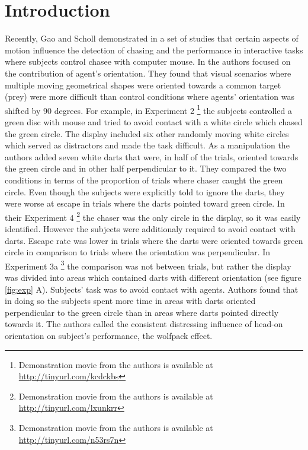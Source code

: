\documentclass[10pt]{article}
\begin{document}
\section*{Introduction}
Recently, Gao and Scholl demonstrated in a set of studies \cite{gao09,gao10,gao11} that certain aspects of motion influence the detection of chasing and the performance in interactive tasks where subjects control chasee with computer mouse. 
In \cite{gao10} the authors focused on the contribution of agent's orientation. 
They found that visual scenarios where multiple moving geometrical shapes were oriented towards a common target (prey) were more difficult than control conditions where agents' orientation was shifted by 90 degrees. 
For example, in Experiment 2 \footnote{Demonstration movie from the authors is available at \url{http://tinyurl.com/kcdckbs}} the subjects controlled a green disc with mouse and tried to avoid contact with a white circle which chased the green circle. 
The display included six other randomly moving white circles which served as distractors and made the task difficult. 
As a manipulation the authors added seven white darts that were, in half of the trials, oriented towards the green circle and in other half perpendicular to it. 
They compared the two conditions in terms of the proportion of trials where chaser caught the green circle. 
Even though the subjects were explicitly told to ignore the darts, they were worse at escape in trials where the darts pointed toward green circle. 
In their Experiment 4 \footnote{Demonstration movie from the authors is available at \url{http://tinyurl.com/lxunkrr}} the chaser was the only circle in the display, so it was easily identified. 
However the subjects were additionaly required to avoid contact with darts. 
Escape rate was lower in trials where the darts were oriented towards green circle in comparison to trials where the orientation was perpendicular. 
In Experiment 3a \footnote{Demonstration movie from the authors is available at \url{http://tinyurl.com/n53rs7n}} the comparison was not between trials, but rather the display was divided into areas which contained darts with different orientation (see figure \ref{fig:exp} A). 
Subjects' task was to avoid contact with agents. 
Authors found that in doing so the subjects spent more time in areas with darts oriented perpendicular to the green circle than in areas where darts pointed directly towards it.
The authors called the consistent distressing influence of head-on orientation on subject's performance, the wolfpack effect.\\
\end{document}
